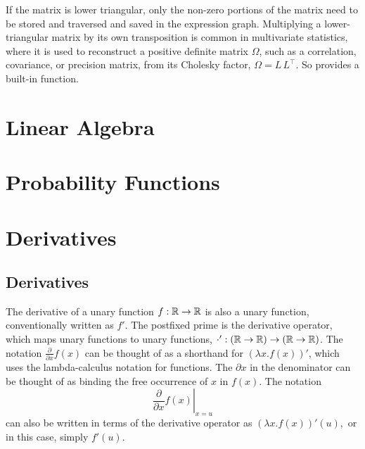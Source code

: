 \documentclass[10pt]{article}
\begin{document}
If the matrix is lower triangular, only the non-zero portions of the
matrix need to be stored and traversed and saved in the expression
graph.  Multiplying a lower-triangular matrix by its own transposition
is common in multivariate statistics, where it is used to reconstruct
a positive definite matrix $\Omega$, such as a correlation,
covariance, or precision matrix, from its Cholesky factor, $\Omega =
L\,L^{\top}$.  So  provides a built-in
 function.







\section{Linear Algebra}





\section{Probability Functions}






\clearpage
\appendix

\section{Derivatives}\label{derivative-definitions.section}

\subsection{Derivatives}

The derivative of a unary function $f:\mathbb{R} \rightarrow \mathbb{R}$ is
also a unary function, conventionally written as $f'$.  The postfixed prime is
the derivative operator, which maps unary functions to unary
functions, $\cdot' : \left(\mathbb{R} \rightarrow \mathbb{R}\right)
\rightarrow \left(\mathbb{R} \rightarrow \mathbb{R}\right)$.  The notation
$\frac{\partial}{\partial x} f(x)$ can be thought of as a shorthand
for $\left( \lambda x. f(x) \right)'$, which uses the lambda-calculus
notation for functions. The $\partial x$ in the denominator can be
thought of as binding the free occurrence of $x$ in $f(x)$.  The
notation
\[
\left. \frac{\partial}{\partial x} f(x) \right|_{x = u}
\]
can also be written in terms of the derivative operator as $\left(
  \lambda x. f(x) \right)'(u),$ or in this case, simply $f'(u)$.
\end{document}
